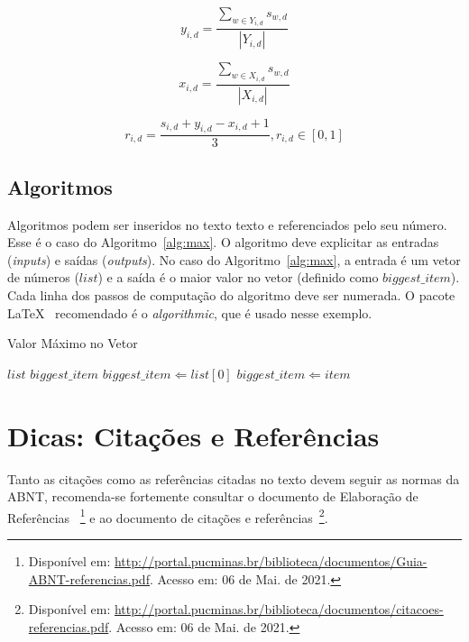 \documentclass[a4paper,12pt]{article}
\begin{document}
\begin{equation}
\label{eq:aid}
y_{i,d}=\frac{\displaystyle\sum_{w\in Y_{i,d}}s_{w,d}}{|Y_{i,d}|}
\end{equation}

\begin{equation}
\label{eq:bid}
x_{i,d}=\frac{\displaystyle\sum_{w\in X_{i,d}}s_{w,d}}{|X_{i,d}|}
\end{equation}

\begin{equation}
\label{eq:qscore}
r_{i,d} = \frac{s_{i,d} + y_{i,d}-x_{i,d} + 1}{3}, r_{i,d}\in[0,1]
\end{equation}

\subsection{Algoritmos}

Algoritmos podem ser inseridos no texto texto e referenciados pelo seu número. Esse é o caso do Algoritmo~\ref{alg:max}. O algoritmo deve explicitar as entradas (\textit{inputs}) e saídas (\textit{outputs}). No caso do Algoritmo~\ref{alg:max}, a entrada é um vetor de números ($list$) e a saída é o maior valor no vetor (definido como $biggest\_item$). Cada linha dos passos de computação do algoritmo deve ser numerada. O pacote \LaTeX~ recomendado é o \textit{algorithmic}, que é usado nesse exemplo.

\begin{algorithm}
\caption{Valor Máximo no Vetor}
\label{alg:max}
\begin{algorithmic}[1]
\REQUIRE $list$
\ENSURE $biggest\_item$
    \STATE $biggest\_item \Leftarrow list[0]$
            \STATE $biggest\_item \Leftarrow item$
        \ENDIF
    \ENDFOR
\end{algorithmic}
\end{algorithm}

\section{Dicas: Citações e Referências}
\label{sec:ref}

Tanto as citações como as referências citadas no texto devem seguir as normas da ABNT, recomenda-se fortemente consultar o documento de Elaboração de Referências~\cite{manualpucref} \footnote{Disponível em: \url{http://portal.pucminas.br/biblioteca/documentos/Guia-ABNT-referencias.pdf}. Acesso em: 06 de Mai. de 2021.} e ao documento de citações e referências~\cite{manualpuccit}\footnote{Disponível em: \url{http://portal.pucminas.br/biblioteca/documentos/citacoes-referencias.pdf}. Acesso em: 06 de Mai. de 2021.}.
\end{document}

